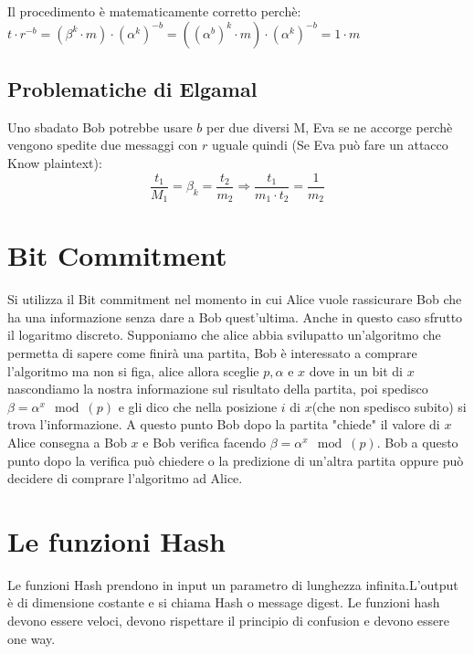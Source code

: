 \documentclass[10pt,a4paper]{article}
\begin{document}
Il procedimento è matematicamente corretto perchè:\\
$t\cdot r^{-b}=(\beta^k\cdot m)\cdot(\alpha^k)^{-b}=((\alpha^b)^{k}\cdot m)\cdot(\alpha^k)^{-b} = 1 \cdot m$

\subsection{Problematiche di Elgamal}
Uno sbadato Bob potrebbe usare $b$ per due diversi M, Eva se ne accorge perchè vengono spedite due messaggi con $r$ uguale quindi (Se Eva può fare un attacco Know plaintext):
$$ \frac{t_1}{M_1}=\beta_k=\frac{t_2}{m_2} \Rightarrow \frac{t_1}{m_1\cdot t_2} = \frac{1}{m_2} $$

\section{Bit Commitment}
Si utilizza il Bit commitment nel momento in cui Alice vuole rassicurare Bob che ha una informazione senza dare a Bob quest'ultima. Anche in questo caso sfrutto il logaritmo discreto. Supponiamo che alice abbia svilupatto un'algoritmo che permetta di sapere come finirà una partita, Bob è interessato a comprare l'algoritmo ma non si figa, alice allora sceglie $p,\alpha$ e $x$ dove in un bit di $x$ nascondiamo la nostra informazione sul risultato della partita, poi spedisco $\beta = \alpha^x \mod(p)$ e gli dico che nella posizione $i$ di $x$(che non spedisco subito) si trova l'informazione. A questo punto Bob dopo la partita "chiede" il valore di $x$ Alice consegna a Bob $x$ e Bob verifica facendo $\beta = \alpha^x \mod(p)$. Bob a questo punto dopo la verifica può chiedere o la predizione di un'altra partita oppure può decidere di comprare l'algoritmo ad Alice.

\section{Le funzioni Hash}
Le funzioni Hash prendono in input un parametro di lunghezza infinita.L'output è di dimensione costante e si chiama Hash o message digest. Le funzioni hash devono essere veloci, devono rispettare il principio di confusion e devono essere one way.
\end{document}
